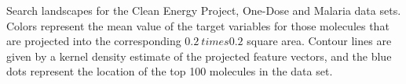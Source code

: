 Search landscapes for the Clean Energy Project, One-Dose and Malaria data sets.  
Colors represent the mean value of the target variables for those molecules that are projected into the corresponding $0.2 \ times 0.2$ square area. Contour lines are given by a kernel density estimate of the projected feature vectors, and the blue dots represent the location of the top 100 molecules in the data set.
\label{fig:info_landscapes}